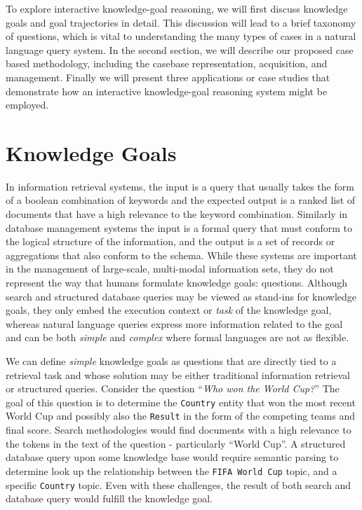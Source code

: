\documentclass{llncs}
\begin{document}
To explore interactive knowledge-goal reasoning, we will first discuss knowledge goals and goal trajectories in detail. This discussion will lead to a brief taxonomy of questions, which is vital to understanding the many types of cases in a natural language query system. In the second section, we will describe our proposed case based methodology, including the casebase representation, acquisition, and management. Finally we will present three applications or case studies that demonstrate how an interactive knowledge-goal reasoning system might be employed.

\section{Knowledge Goals}

In information retrieval systems, the input is a query that usually takes the form of a boolean combination of keywords and the expected output is a ranked list of documents that have a high relevance to the keyword combination. Similarly in database management systems the input is a formal query that must conform to the logical structure of the information, and the output is a set of records or aggregations that also conform to the schema. While these systems are important in the management of large-scale, multi-modal information sets, they do not represent the way that humans formulate knowledge goals: questions. Although search and structured database queries may be viewed as stand-ins for knowledge goals, they only embed the execution context or \textit{task} of the knowledge goal, whereas natural language queries express more information related to the goal and can be both \textit{simple} and \textit{complex} where formal languages are not as flexible.

We can define \textit{simple} knowledge goals as questions that are directly tied to a retrieval task and whose solution may be either traditional information retrieval or structured queries. Consider the question ``\textit{Who won the World Cup?}'' The goal of this question is to determine the \texttt{Country} entity that won the most recent World Cup and possibly also the \texttt{Result} in the form of the competing teams and final score. Search methodologies would find documents with a high relevance to the tokens in the text of the question - particularly ``World Cup''. A structured database query upon some knowledge base would require semantic parsing to determine look up the relationship between the \texttt{FIFA World Cup} topic, and a specific \texttt{Country} topic. Even with these challenges, the result of both search and database query would fulfill the knowledge goal.
\end{document}
